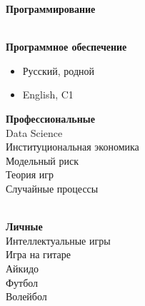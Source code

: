 \documentclass[10pt,a4paper,ragged2e]{altacv}
\begin{document}
\begin{paracol}{2}

\switchcolumn


\textbf {Программирование} \\


\divider\smallskip \\
\textbf {Программное обеспечение }\\



\begin{itemize}
\item Русский, родной
\item English, C1
\end{itemize}

\textbf {Профессиональные} \\
Data Science\\
Институциональная экономика\\
Модельный риск\\ 
Теория игр\\
Случайные процессы


\divider\smallskip \\
\textbf {Личные}\\
Интеллектуальные игры\\
Игра на гитаре\\
Айкидо\\
Футбол\\
Волейбол








\end{paracol}
\end{document}
